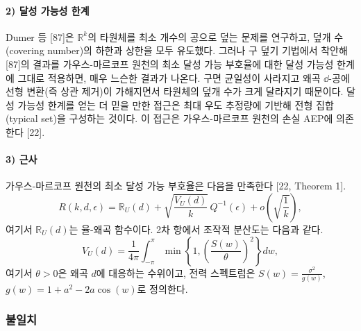 \paragraph{2) 달성 가능성 한계}
Dumer 등 [87]은 $\mathbb{R}^k$의 타원체를 최소 개수의 공으로 덮는 문제를 연구하고, 덮개 수(covering number)의 하한과 상한을 모두 유도했다.
그러나 구 덮기 기법에서 착안해 [87]의 결과를 가우스-마르코프 원천의 최소 달성 가능 부호율에 대한 달성 가능성 한계에 그대로 적용하면, 매우 느슨한 결과가 나온다.
구면 균일성이 사라지고 왜곡 $\dd$-공에 선형 변환(즉 상관 제거)이 가해지면서 타원체의 덮개 수가 크게 달라지기 때문이다.
달성 가능성 한계를 얻는 더 믿을 만한 접근은 최대 우도 추정량에 기반해 전형 집합(typical set)을 구성하는 것이다. 이 접근은 가우스-마르코프 원천의 손실 AEP에 의존한다 [22].

\paragraph{3) 근사}
가우스-마르코프 원천의 최소 달성 가능 부호율은 다음을 만족한다 [22, Theorem 1].
\begin{equation}
  R(k,d,\epsilon) = \mathbb{R}_U(d) + \sqrt{\frac{V_U(d)}{k}}\,Q^{-1}(\epsilon) + o\left(\sqrt{\frac{1}{k}}\right),
  \tag{13}
\end{equation}
여기서 $\mathbb{R}_U(d)$는 율-왜곡 함수이다.
2차 항에서 조작적 분산도는 다음과 같다.
\begin{equation}
  V_U(d) = \frac{1}{4\pi}\int_{-\pi}^{\pi} \min\left\{1, \left(\frac{S(w)}{\theta}\right)^2\right\} dw,
  \tag{14}
\end{equation}
여기서 $\theta>0$은 왜곡 $d$에 대응하는 수위이고, 전력 스펙트럼은 $S(w)=\frac{\sigma^2}{g(w)}$, $g(w)=1+a^2-2a\cos(w)$로 정의한다.

\subsubsection{불일치}

